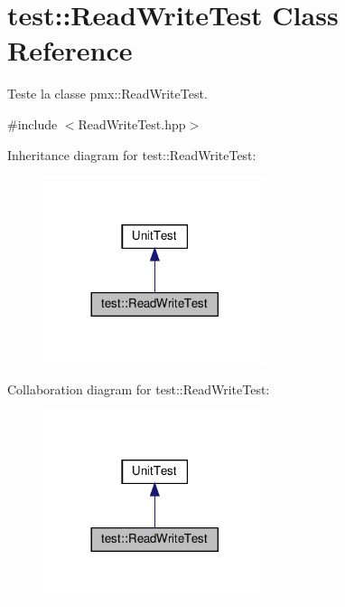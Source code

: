 \hypertarget{classtest_1_1ReadWriteTest}{}\section{test\+:\+:Read\+Write\+Test Class Reference}
\label{classtest_1_1ReadWriteTest}


Teste la classe pmx\+::\+Read\+Write\+Test.  




{\ttfamily \#include $<$Read\+Write\+Test.\+hpp$>$}



Inheritance diagram for test\+:\+:Read\+Write\+Test\+:
\nopagebreak
\begin{figure}[H]
\begin{center}
\leavevmode
\includegraphics[width=185pt]{classtest_1_1ReadWriteTest__inherit__graph}
\end{center}
\end{figure}


Collaboration diagram for test\+:\+:Read\+Write\+Test\+:
\nopagebreak
\begin{figure}[H]
\begin{center}
\leavevmode
\includegraphics[width=185pt]{classtest_1_1ReadWriteTest__coll__graph}
\end{center}
\end{figure}
